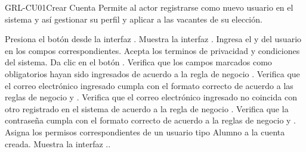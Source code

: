 \begin{UseCase}{GRL-CU01}{Crear Cuenta}{
	Permite al actor registrarse como nuevo usuario en el sistema y así gestionar su perfil y aplicar a las vacantes
	de su elección.
}
	  

\end{UseCase}

\begin{UCtrayectoria}
	\UCpaso [\UCactor] Presiona el botón  desde la interfaz .
    \UCpaso [\UCsist] Muestra la interfaz .
	\UCpaso [\UCactor] Ingresa el  y  del usuario en los compos correspondientes.\label{cu01-grl}
	\UCpaso [\UCactor] Acepta los terminos de privacidad y condiciones del sistema.
	\UCpaso [\UCactor] Da clic en el botón . 
    \UCpaso [\UCsist] Verifica que los campos marcados como obligatorios hayan sido ingresados de acuerdo a la
	regla de negocio .
	\UCpaso [\UCsist] Verifica que el correo electrónico ingresado cumpla con el formato correcto de acuerdo a las reglas de negocio   y  .
	\UCpaso [\UCsist] Verifica que el correo electrónico ingresado no coincida con otro registrado en el sistema de acuerdo a la regla de negocio  .
	\UCpaso [\UCsist] Verifica que la contraseña cumpla con el formato correcto de acuerdo a la reglas de negocio  y  .
	\UCpaso [\UCsist] Asigna los permisos correspondientes de un usuario tipo Alumno a la cuenta creada.
    \UCpaso [\UCsist] Muestra la interfaz ..
\end{UCtrayectoria}

